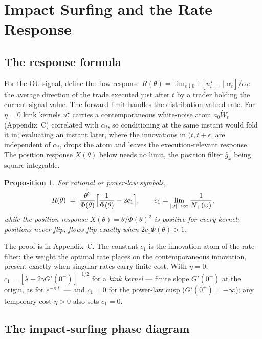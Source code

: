 \documentclass[11pt]{article}
\newcommand{\E}{\mathbb{E}}
\theoremstyle{plain}
\newtheorem{proposition}{Proposition}
\begin{document}
\section{Impact Surfing and the Rate Response}

\subsection{The response formula}

For the OU signal, define the flow response $R(\theta) = \lim_{\epsilon\downarrow0}\E[u^\star_{t+\epsilon}\mid\alpha_t]/\alpha_t$: the average direction of the trade executed just after $t$ by a trader holding the current signal value. The forward limit handles the distribution-valued rate. For $\eta=0$ kink kernels $u^\star_t$ carries a contemporaneous white-noise atom $a_0\dot W_t$ (Appendix~C) correlated with $\alpha_t$, so conditioning at the same instant would fold it in; evaluating an instant later, where the innovations in $(t,t+\epsilon]$ are independent of $\alpha_t$, drops the atom and leaves the execution-relevant response. The position response $X(\theta)$ below needs no limit, the position filter $\hat g_x$ being square-integrable.

\begin{proposition}\label{prop:response}
For rational or power-law symbols,
\begin{equation}\label{eq:response}
R(\theta) \;=\; \frac{\theta^2}{\Phi(\theta)}\Bigl[\frac{1}{\Phi(\theta)} - 2c_1\Bigr],
\qquad c_1 = \lim_{|\omega|\to\infty}\frac{1}{N_+(\omega)},
\end{equation}
while the position response $X(\theta) = \theta/\Phi(\theta)^2$ is positive for every kernel: positions never flip; flows flip exactly when $2c_1\Phi(\theta) > 1$.
\end{proposition}

The proof is in Appendix~C. The constant $c_1$ is the innovation atom of the rate filter: the weight the optimal rate places on the contemporaneous innovation, present exactly when singular rates carry finite cost. With $\eta = 0$, $c_1 = [\lambda - 2\gamma G'(0^+)]^{-1/2}$ for a \emph{kink kernel} --- finite slope $G'(0^+)$ at the origin, as for $e^{-\kappa|t|}$ --- and $c_1 = 0$ for the power-law cusp ($G'(0^+)=-\infty$); any temporary cost $\eta>0$ also sets $c_1 = 0$.

\subsection{The impact-surfing phase diagram}
\end{document}
